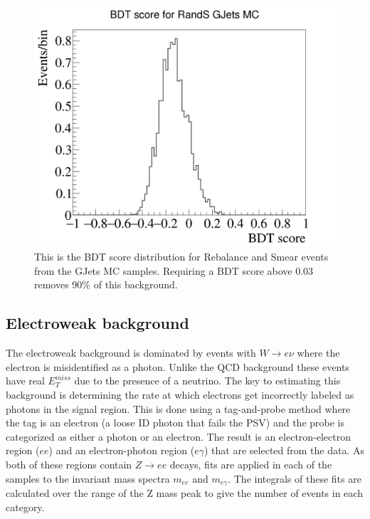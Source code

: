 \begin{figure}[h]
	\centering
	\includegraphics[width=0.7\linewidth]{Figures/BDT_Gjets}
	\caption[BDT response to Rebalance and Smear events in GJets MC]{This is the BDT score distribution for Rebalance and Smear events from the GJets MC samples. Requiring a BDT score above 0.03 removes 90\% of this background.}
	\label{fig:bdtgjets}
\end{figure}


\subsection{Electroweak background}
The electroweak background is dominated by events with $W \rightarrow e \nu$ where the electron is misidentified as a photon.  Unlike the QCD background these events have  real $E^{miss}_T$ due to the presence of a neutrino.  The key to estimating this background is determining the rate at which electrons get incorrectly labeled as photons in the signal region.  This is done using a tag-and-probe method where the tag is an electron (a loose ID photon that fails the PSV) and the probe is categorized as either a photon or an electron.  The result is an electron-electron region ($ee$) and an electron-photon region ($e\gamma$) that are selected from the data.    As both of these regions contain $Z\rightarrow ee$ decays, fits are applied in each of the samples to the invariant mass spectra $m_{ee}$ and $m_{e\gamma}$.  The integrals of these fits are calculated over the range of the Z mass peak to give the number of events in each category.  


